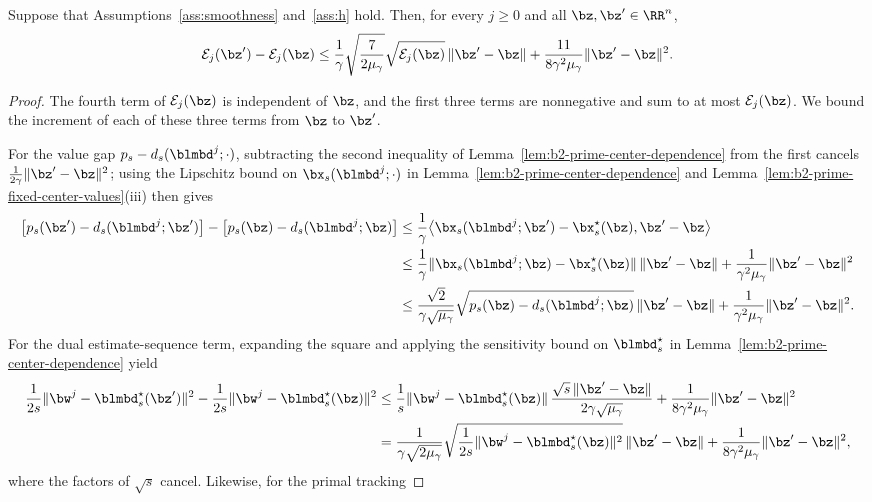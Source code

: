 \begin{lemma}
\label{lem:b2-prime-center-error}
Suppose that Assumptions~\ref{ass:smoothness} and~\ref{ass:h} hold. Then, for
every \(j\ge0\) and all \(\bz,\bz'\in\RR^n\),
\[
    \mathcal E_j(\bz')-\mathcal E_j(\bz)
    \le\frac{1}{\gamma}\sqrt{\frac{7}{2\mu_\gamma}}
    \sqrt{\mathcal E_j(\bz)}\,\|\bz'-\bz\|
    +\frac{11}{8\gamma^2\mu_\gamma}\|\bz'-\bz\|^2 .
\]
\end{lemma}

\begin{proof}
The fourth term of \(\mathcal E_j(\bz)\) is independent of \(\bz\), and the
first three terms are nonnegative and sum to at most \(\mathcal E_j(\bz)\). We
bound the increment of each of these three terms from \(\bz\) to \(\bz'\).

For the value gap \(p_s-d_s(\blmbd^j;\cdot)\), subtracting the second
inequality of Lemma~\ref{lem:b2-prime-center-dependence} from the first cancels
\(\frac{1}{2\gamma}\|\bz'-\bz\|^2\); using the Lipschitz bound on
\(\bx_s(\blmbd^j;\cdot)\) in Lemma~\ref{lem:b2-prime-center-dependence} and
Lemma~\ref{lem:b2-prime-fixed-center-values}(iii) then gives
\[
\begin{aligned}
    \bigl[p_s(\bz')-d_s(\blmbd^j;\bz')\bigr]
    -\bigl[p_s(\bz)-d_s(\blmbd^j;\bz)\bigr]
    &\le\frac{1}{\gamma}\bigl\langle
    \bx_s(\blmbd^j;\bz')-\bx_s^\star(\bz),\bz'-\bz\bigr\rangle\\
    &\le\frac{1}{\gamma}\|\bx_s(\blmbd^j;\bz)-\bx_s^\star(\bz)\|\,\|\bz'-\bz\|
    +\frac{1}{\gamma^2\mu_\gamma}\|\bz'-\bz\|^2\\
    &\le\frac{\sqrt2}{\gamma\sqrt{\mu_\gamma}}
    \sqrt{p_s(\bz)-d_s(\blmbd^j;\bz)}\,\|\bz'-\bz\|
    +\frac{1}{\gamma^2\mu_\gamma}\|\bz'-\bz\|^2 .
\end{aligned}
\]
For the dual estimate-sequence term, expanding the square and applying the
sensitivity bound on \(\blmbd_s^\star\) in
Lemma~\ref{lem:b2-prime-center-dependence} yield
\[
\begin{aligned}
    \frac{1}{2s}\|\bw^j-\blmbd_s^\star(\bz')\|^2
    -\frac{1}{2s}\|\bw^j-\blmbd_s^\star(\bz)\|^2
    &\le\frac{1}{s}\|\bw^j-\blmbd_s^\star(\bz)\|\,
    \frac{\sqrt{s}\,\|\bz'-\bz\|}{2\gamma\sqrt{\mu_\gamma}}
    +\frac{1}{8\gamma^2\mu_\gamma}\|\bz'-\bz\|^2\\
    &=\frac{1}{\gamma\sqrt{2\mu_\gamma}}
    \sqrt{\frac{1}{2s}\|\bw^j-\blmbd_s^\star(\bz)\|^2}\,\|\bz'-\bz\|
    +\frac{1}{8\gamma^2\mu_\gamma}\|\bz'-\bz\|^2 ,
\end{aligned}
\]
where the factors of \(\sqrt{s}\) cancel. Likewise, for the primal tracking

\end{proof}
